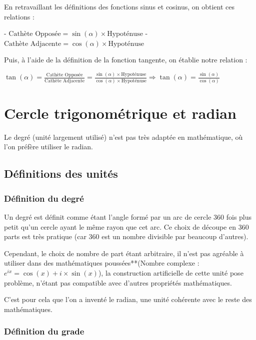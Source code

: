 \documentclass[a4paper]{article}
\begin{document}
			En retravaillant les définitions des fonctions sinus et cosinus, on obtient ces relations :

			- $\text{Cathète Opposée} = \sin(\alpha) \times \text{Hypoténuse}$
			- $\text{Cathète Adjacente} = \cos(\alpha) \times \text{Hypoténuse}$

			Puis, à l'aide de la définition de la fonction tangente, on établie notre relation :

			$\tan(\alpha) = \frac{\text{Cathète Opposée}}{\text{Cathète Adjacente}} = \frac{\sin(\alpha) \times \text{Hypoténuse}}{\cos(\alpha) \times \text{Hypoténuse}} \Longrightarrow \tan(\alpha) = \frac{\sin(\alpha)}{\cos(\alpha)}$

	\section{Cercle trigonométrique et radian}

		Le degré (unité largement utilisé) n'est pas très adaptée en mathématique, où l'on préfère utiliser le radian.

		\subsection{Définitions des unités}

			\subsubsection{Définition du degré}

				Un degré est définit comme étant l'angle formé par un arc de cercle 360 fois plus petit qu'un cercle ayant le même rayon que cet arc. Ce choix de découpe en 360 parts est très pratique (car 360 est un nombre divisible par beaucoup d'autres). 

				Cependant, le choix de nombre de part étant arbitraire, il n'est pas agréable à utiliser dans des mathématiques poussées**(Nombre complexe : $e^{ix}=\cos(x)+i \times \sin(x)$), la construction artificielle de cette unité pose problème, n'étant pas compatible avec d'autres propriétés mathématiques. 

				C'est pour cela que l'on a inventé le radian, une unité cohérente avec le reste des mathématiques.

			\subsubsection{Définition du grade}
\end{document}
